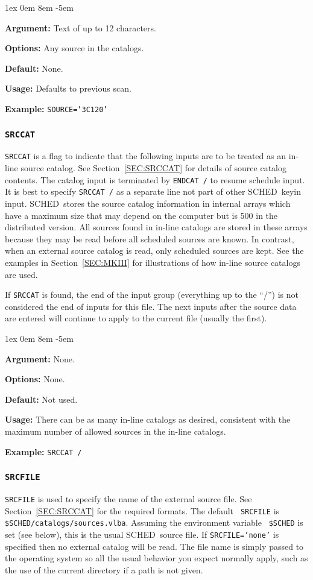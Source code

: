 \documentclass{report}
\newcommand{\schedb}{{\sc SCHED~}}
\newcommand{\rcwbox}[5]{
  \begin{list}{}{\parsep 1ex  \itemsep 0em
                 \leftmargin 8em  \itemindent -5em }
    \item {\bf Argument:} #1
    \item {\bf Options:}  #2
    \item {\bf Default:}  #3
    \item {\bf Usage:}    #4
    \item {\bf Example:}  #5
  \end{list}
}
\begin{document}
\rcwbox
{Text of up to 12 characters.}
{Any source in the catalogs.}
{None.}
{Defaults to previous scan.}
{{\tt SOURCE='3C120'}}


\subsubsection{\label{MP:SRCCAT}{\tt SRCCAT}}

{\tt SRCCAT} is a flag to indicate that the following inputs are
to be treated as an in-line source catalog. See
Section~\ref{SEC:SRCCAT} for details of source catalog contents. The
catalog input is terminated by {\tt ENDCAT /} to resume schedule
input.  It is best to specify {\tt SRCCAT /} as a separate line not
part of other \schedb keyin input. \schedb stores the source
catalog information in internal arrays which have a maximum size that
may depend on the computer but is 500 in the distributed version. All
sources found in in-line catalogs are stored in these arrays because
they may be read before all scheduled sources are known. In contrast,
when an external source catalog is read, only scheduled sources are
kept. See the examples in Section~\ref{SEC:MKIII} for illustrations
of how in-line source catalogs are used.

If {\tt SRCCAT}
is found, the end of the input group (everything up to the ``/'')
is not considered the end of inputs for this file.  The next inputs
after the source data are entered will continue to apply to the current
file (usually the first).

\rcwbox
{None.}
{None.}
{Not used.}
{There can be as many in-line catalogs as desired, consistent with
the maximum number of allowed sources in the in-line catalogs.}
{{\tt SRCCAT /}}


\subsubsection{\label{MP:SRCFILE}{\tt SRCFILE}}

{\tt SRCFILE} is used to specify the name of the external source
file. See Section~\ref{SEC:SRCCAT} for the required formats. The default {\tt
SRCFILE} is {\tt
\$SCHED/catalogs/sources.vlba}.  Assuming the environment variable {\tt
\$SCHED} is set (see below), this is the usual \schedb source file.
If {\tt SRCFILE='none'} is specified then no external catalog will be
read.  The file name is simply passed to the operating system so all
the usual behavior you expect normally apply, such as the use of the
current directory if a path is not given.
\end{document}

